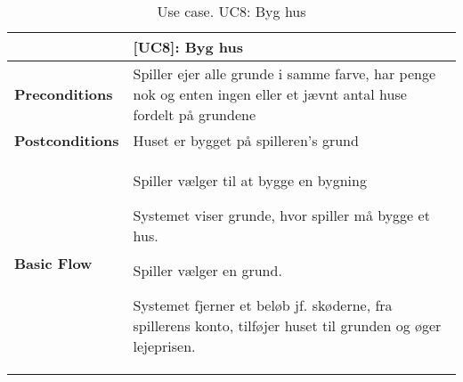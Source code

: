 \documentclass[class=article, crop=false]{standalone}
\begin{document}
    \begin{table}[H]
        \caption{Use case. UC8: Byg hus}
        \begin{tabularx}{\textwidth}{|l|X|}
            \hline
            & \textbf{[UC8]: Byg hus}   \\ \hline
            \textbf{Preconditions}       & Spiller ejer alle grunde i samme farve, har penge nok og enten ingen eller et jævnt antal huse fordelt på grundene\\ \hline
            \textbf{Postconditions}      & Huset er bygget på spilleren's grund\\ \hline


            \textbf{Basic Flow} & \begin{tabenum}
                                      \item Spiller vælger til at bygge en bygning
                                      \item Systemet viser grunde, hvor spiller må bygge et hus.
                                      \item Spiller vælger en grund.
                                      \item Systemet fjerner et beløb jf. skøderne, fra spillerens konto, tilføjer huset til grunden og øger lejeprisen.
            \end{tabenum}   \\ \hline

        \end{tabularx}


    \end{table}
\end{document}
